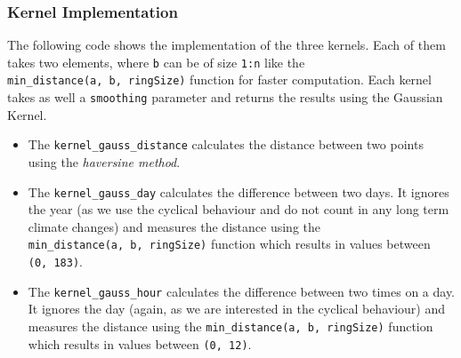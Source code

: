 \documentclass[]{article}
\providecommand{\tightlist}{%
  \setlength{\itemsep}{0pt}\setlength{\parskip}{0pt}}
\begin{document}
\subsubsection{Kernel Implementation}\label{kernel-implementation}

The following code shows the implementation of the three kernels. Each
of them takes two elements, where \texttt{b} can be of size \texttt{1:n}
like the \texttt{min\_distance(a,\ b,\ ringSize)} function for faster
computation. Each kernel takes as well a \texttt{smoothing} parameter
and returns the results using the Gaussian Kernel.

\begin{itemize}
\tightlist
\item
  The \texttt{kernel\_gauss\_distance} calculates the distance between
  two points using the \emph{haversine method}.
\item
  The \texttt{kernel\_gauss\_day} calculates the difference between two
  days. It ignores the year (as we use the cyclical behaviour and do not
  count in any long term climate changes) and measures the distance
  using the \texttt{min\_distance(a,\ b,\ ringSize)} function which
  results in values between \texttt{(0,\ 183)}.
\item
  The \texttt{kernel\_gauss\_hour} calculates the difference between two
  times on a day. It ignores the day (again, as we are interested in the
  cyclical behaviour) and measures the distance using the
  \texttt{min\_distance(a,\ b,\ ringSize)} function which results in
  values between \texttt{(0,\ 12)}.
\end{itemize}
\end{document}
